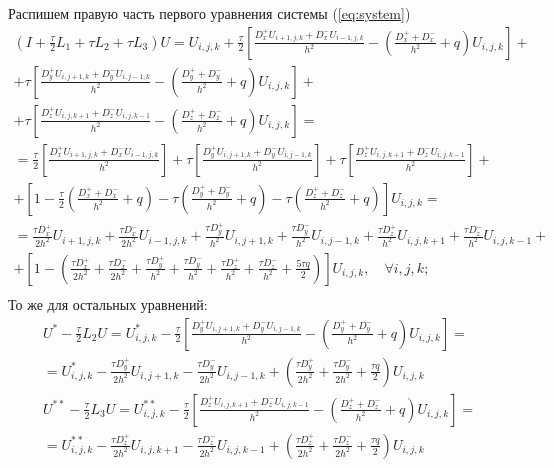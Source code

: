 \documentclass[a4paper,12pt]{article}
\begin{document}
Распишем правую часть первого уравнения системы (\ref{eq:system})
\begin{multline}
  \left( I + \frac{\tau}{2} L_1 +  \tau L_2 + \tau L_3 \right) U
  = U_{i,j,k} + \frac{\tau}{2} \left[ \frac{D^+_x U_{i+1,j,k} + D^-_x U_{i-1,j,k}}{h^2} - \left(\frac{D^+_x + D^-_x}{h^2} + q \right) U_{i,j,k} \right] +  \\
  + \tau \left[ \frac{D^+_y U_{i,j+1,k} + D^-_y U_{i,j-1,k}}{h^2} - \left(\frac{D^+_y + D^-_y}{h^2} + q \right) U_{i,j,k} \right] + \\
  + \tau \left[ \frac{D^+_z U_{i,j,k+1} + D^-_z U_{i,j,k-1}}{h^2} - \left(\frac{D^+_z + D^-_z}{h^2} + q \right) U_{i,j,k} \right] = \\
  = \frac{\tau}{2} \left[ \frac{D^+_x U_{i+1,j,k} + D^-_x U_{i-1,j,k}}{h^2} \right] + \tau \left[\frac{D^+_y U_{i,j+1,k} + D^-_y U_{i,j-1,k}}{h^2} \right] + \tau \left[ \frac{D^+_z U_{i,j,k+1} + D^-_z U_{i,j,k-1}}{h^2} \right] + \\
  + \left[ 1 - \frac{\tau}{2} \left(\frac{D^+_x + D^-_x}{h^2} + q \right) - \tau \left(\frac{D^+_y + D^-_y}{h^2} + q \right) - \tau \left(\frac{D^+_z + D^-_z}{h^2} + q \right) \right] U_{i,j,k} = \\
  = \frac{\tau D^+_x}{2h^2} U_{i+1,j,k} + \frac{\tau D^-_x}{2h^2} U_{i-1,j,k} + \frac{\tau D^+_y}{h^2} U_{i,j+1,k} + \frac{\tau D^-_y}{h^2} U_{i,j-1,k} + \frac{\tau D^+_z}{h^2} U_{i,j,k+1} + \frac{\tau D^-_z}{h^2} U_{i,j,k-1} + \\
  + \left[ 1 - \left( \frac{\tau D^+_x}{2h^2} + \frac{\tau D^-_x}{2h^2} + \frac{\tau D^+_y}{h^2} + \frac{\tau D^-_y}{h^2} + \frac{\tau D^+_z}{h^2} + \frac{\tau D^-_z}{h^2} + \frac{5 \tau q}{2} \right) \right] U_{i,j,k} , \quad \forall i,j,k; \\
\end{multline}
То же для остальных уравнений:
\begin{equation*}
  \begin{aligned}
    U^{*} - \frac{\tau}{2} L_2 U = U^{*}_{i,j,k} - \frac{\tau}{2} \left[ \frac{D^+_y U_{i,j+1,k} + D^-_y U_{i,j-1,k}}{h^2} - \left(\frac{D^+_y + D^-_y}{h^2} + q \right) U_{i,j,k} \right] = \\
 = U^{*}_{i,j,k} - \frac{\tau D^+_y}{2 h^2} U_{i,j+1,k} - \frac{\tau D^-_y}{2 h^2} U_{i,j-1,k} + \left( \frac{\tau D^+_y}{2 h^2} + \frac{\tau D^-_y}{2 h^2} + \frac{\tau q}{2}  \right) U_{i,j,k} \\
    U^{**} - \frac{\tau}{2} L_3 U = U^{**}_{i,j,k} - \frac{\tau}{2} \left[ \frac{D^+_z U_{i,j,k+1} + D^-_z U_{i,j,k-1}}{h^2} - \left(\frac{D^+_z + D^-_z}{h^2} + q \right) U_{i,j,k} \right] = \\
    = U^{**}_{i,j,k} - \frac{\tau D^+_z}{2h^2} U_{i,j,k+1} - \frac{\tau D^-_z}{2h^2} U_{i,j,k-1} + \left(\frac{\tau D^+_z}{2h^2} +\frac{\tau D^-_z}{2h^2} + \frac{\tau q}{2} \right) U_{i,j,k}
  \end{aligned}
\end{equation*}
\end{document}

